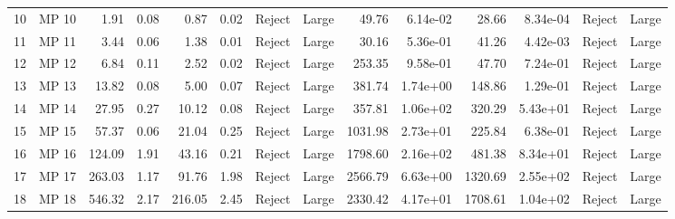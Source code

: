 \begin{tabular}{llrrrrllrrrrll}
10 &  MP 10 &               1.91 &  0.08 &                0.87 &  0.02 &   Reject &       Large &                    49.76 &  6.14e-02 &                     28.66 &  8.34e-04 &   Reject &       Large \\
11 &  MP 11 &               3.44 &  0.06 &                1.38 &  0.01 &   Reject &       Large &                    30.16 &  5.36e-01 &                     41.26 &  4.42e-03 &   Reject &       Large \\
12 &  MP 12 &               6.84 &  0.11 &                2.52 &  0.02 &   Reject &       Large &                   253.35 &  9.58e-01 &                     47.70 &  7.24e-01 &   Reject &       Large \\
13 &  MP 13 &              13.82 &  0.08 &                5.00 &  0.07 &   Reject &       Large &                   381.74 &  1.74e+00 &                    148.86 &  1.29e-01 &   Reject &       Large \\
14 &  MP 14 &              27.95 &  0.27 &               10.12 &  0.08 &   Reject &       Large &                   357.81 &  1.06e+02 &                    320.29 &  5.43e+01 &   Reject &       Large \\
15 &  MP 15 &              57.37 &  0.06 &               21.04 &  0.25 &   Reject &       Large &                  1031.98 &  2.73e+01 &                    225.84 &  6.38e-01 &   Reject &       Large \\
16 &  MP 16 &             124.09 &  1.91 &               43.16 &  0.21 &   Reject &       Large &                  1798.60 &  2.16e+02 &                    481.38 &  8.34e+01 &   Reject &       Large \\
17 &  MP 17 &             263.03 &  1.17 &               91.76 &  1.98 &   Reject &       Large &                  2566.79 &  6.63e+00 &                   1320.69 &  2.55e+02 &   Reject &       Large \\
18 &  MP 18 &             546.32 &  2.17 &              216.05 &  2.45 &   Reject &       Large &                  2330.42 &  4.17e+01 &                   1708.61 &  1.04e+02 &   Reject &       Large \\
\bottomrule
\end{tabular}
